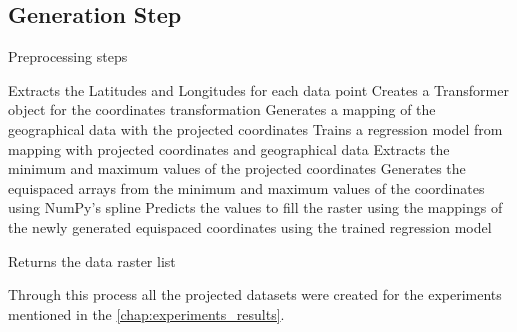 
\subsection{Generation Step}
\begin{algorithm}
    \caption{Preprocessing steps}
    \label{}
    \begin{algorithmic}[1]
        \STATE Extracts the Latitudes and Longitudes for each data point
        \STATE Creates a Transformer object for the coordinates transformation
        \STATE Generates a mapping of the geographical data with the projected coordinates
        \STATE Trains a regression model from mapping with projected coordinates and geographical data
        \STATE Extracts the minimum and maximum values of the projected coordinates
        \STATE Generates the equispaced arrays from the minimum and maximum values of the coordinates using NumPy's spline
        \STATE Predicts the values to fill the raster using the mappings of the newly generated equispaced coordinates  using the trained regression model

        \ENDFOR
        \STATE Returns the data raster list
    \end{algorithmic}
\end{algorithm}

Through this process all the projected datasets were created for the experiments mentioned in the \autoref{chap:experiments_results}.